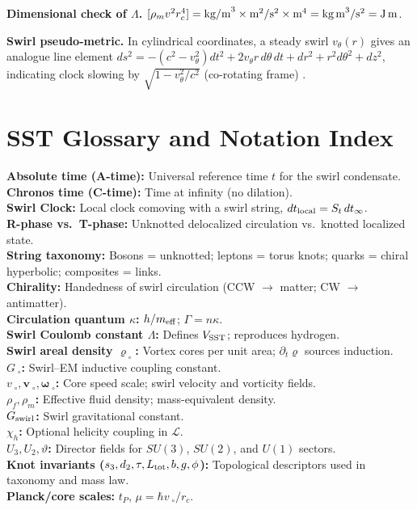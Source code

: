 \documentclass[11pt]{article}
\begin{document}
	\textbf{Dimensional check of $\Lambda$.} $[\rho_m v^2 r_c^4] = \text{kg/m}^3\times \text{m}^2/\text{s}^2\times \text{m}^4 = \text{kg\,m}^3/\text{s}^2 = \text{J\,m}$.

	\textbf{Swirl pseudo-metric.} In cylindrical coordinates, a steady swirl $v_\theta(r)$ gives an analogue line element $ds^2 = -(c^2 - v_\theta^2)dt^2 + 2 v_\theta r\,d\theta\,dt + dr^2 + r^2 d\theta^2 + dz^2$, indicating clock slowing by $\sqrt{1-v_\theta^2/c^2}$ (co-rotating frame) \cite{Iskandarani2025Canon034}.

	\section{SST Glossary and Notation Index}\label{app:glossary}

	\textbf{Absolute time (A-time):} Universal reference time $t$ for the swirl condensate. \\
	\textbf{Chronos time (C-time):} Time at infinity (no dilation). \\
	\textbf{Swirl Clock:} Local clock comoving with a swirl string, $dt_{\rm local}=S_t\,dt_\infty$. \\
	\textbf{R-phase vs.\ T-phase:} Unknotted delocalized circulation vs.\ knotted localized state. \\
	\textbf{String taxonomy:} Bosons = unknotted; leptons = torus knots; quarks = chiral hyperbolic; composites = links. \\
	\textbf{Chirality:} Handedness of swirl circulation (CCW $\to$ matter; CW $\to$ antimatter). \\
	\textbf{Circulation quantum $\kappa$:} $h/m_{\rm eff}$; $\Gamma=n\kappa$. \\
	\textbf{Swirl Coulomb constant $\Lambda$:} Defines $V_{\rm SST}$; reproduces hydrogen. \\
	\textbf{Swirl areal density $\varrho_{\!\!\;\circ}$:} Vortex cores per unit area; $\partial_t\varrho$ sources induction. \\
	\textbf{$G_{\!\!\;\circ}$:} Swirl--EM inductive coupling constant. \\
	\textbf{$v_{\!\!\;\circ}, \mathbf{v}_{\!\!\;\circ}, \boldsymbol{\omega}_{\!\!\;\circ}$:} Core speed scale; swirl velocity and vorticity fields. \\
	\textbf{$\rho_f, \rho_m$:} Effective fluid density; mass-equivalent density. \\
	\textbf{$G_{\rm swirl}$:} Swirl gravitational constant. \\
	\textbf{$\chi_h$:} Optional helicity coupling in $\mathcal{L}$. \\
	\textbf{$U_3, U_2, \vartheta$:} Director fields for $SU(3)$, $SU(2)$, and $U(1)$ sectors. \\
	\textbf{Knot invariants ($s_3,d_2,\tau,L_{\rm tot},b,g,\phi$):} Topological descriptors used in taxonomy and mass law. \\
	\textbf{Planck/core scales:} $t_P$, $\mu=\hbar v_{\!\!\;\circ}/r_c$.
\end{document}
